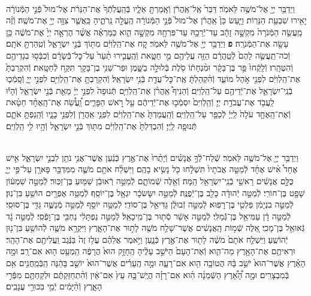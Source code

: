 \documentclass[twoside, openany, parskip=half, 11pt]{book}
\begin{document}
\begin{sometimes}
\begin{footnotesize}
\begin{multicols}{2}
\\
וַיְדַבֵּ֥ר יְיָ֖ אֶל־מֹשֶׁ֥ה לֵּאמֹֽר׃ דַּבֵּר֙ אֶֽל־אַֽהֲרֹ֔ן וְֿאָֽמַרְתָּ֖ אֵלָ֑יו בְּֿהַֽעֲלֹֽתְֿךָ֙ אֶת־הַנֵּרֹ֔ת אֶל־מוּל֙ פְּֿנֵ֣י הַמְּֿנוֹרָ֔ה יָאִ֖ירוּ שִׁבְעַ֥ת הַנֵּרֽוֹת׃ וַיַּ֤עַשׂ כֵּן֙ אַֽהֲרֹ֔ן אֶל־מוּל֙ פְּֿנֵ֣י הַמְּֿנוֹרָ֔ה הֶֽעֱלָ֖ה נֵֽרֹתֶ֑יהָ כַּֽאֲשֶׁ֛ר צִוָּ֥ה יְיָ֖ אֶת־מֹשֶֽׁה׃ וְֿזֶ֨ה מַֽעֲשֵׂ֤ה הַמְּֿנֹרָה֙ מִקְשָׁ֣ה זָהָ֔ב עַד־יְֿרֵכָ֥הּ עַד־פִּרְחָ֖הּ מִקְשָׁ֣ה הִ֑וא כַּמַּרְאֶ֗ה אֲשֶׁ֨ר הֶרְאָ֤ה יְיָ֙ אֶת־מֹשֶׁ֔ה כֵּ֥ן עָשָׂ֖ה אֶת־הַמְּֿנֹרָֽה׃ \textbf{פ}
וַיְדַבֵּ֥ר יְיָ֖ אֶל־מֹשֶׁ֥ה לֵּאמֹֽר׃ קַ֚ח אֶת־הַֽלְוִיִּ֔ם מִתּ֖וֹךְ בְּֿנֵ֣י יִשְׂרָאֵ֑ל וְֿטִֽהַרְתָּ֖ אֹתָֽם׃ וְֿכֹה־תַֽעֲשֶׂ֤ה לָהֶם֙ לְֿטַֽהֲרָ֔ם הַזֵּ֥ה עֲלֵיהֶ֖ם מֵ֣י חַטָּ֑את וְֿהֶֽעֱבִ֤ירוּ תַ֨עַר֙ עַל־כׇּל־בְּֿֿשָׂרָ֔ם וְֿכִבְּֿס֥וּ בִגְדֵיהֶ֖ם וְֿהִטֶּהָֽרוּ׃ וְֿלָֽקְֿחוּ֙ פַּ֣ר בֶּן־בָּקָ֔ר וּמִ֨נְחָת֔וֹ סֹ֖לֶת בְּֿלוּלָ֣ה בַשָּׁ֑מֶן וּפַר־שֵׁנִ֥י בֶן־בָּקָ֖ר תִּקַּ֥ח לְֿחַטָּֽאת׃ וְֿהִקְרַבְתָּ֙ אֶת־הַֽלְוִיִּ֔ם לִפְנֵ֖י אֹ֣הֶל מוֹעֵ֑ד וְֿהִ֨קְהַלְתָּ֔ אֶֽת־כׇּל־עֲדַ֖ת בְּֿנֵ֥י יִשְׂרָאֵֽל׃  וְֿהִקְרַבְתָּ֥ אֶת־הַֽלְוִיִּ֖ם לִפְנֵ֣י יְיָ֑ וְֿסָֽמְֿכ֧וּ בְֿנֵֽי־יִשְׂרָאֵ֛ל אֶת־יְֿדֵיהֶ֖ם עַל־הַֽלְוִיִּֽם׃ וְֿהֵנִיף֩ אַֽהֲרֹ֨ן אֶת־הַֽלְוִיִּ֤ם תְּֿנוּפָה֙ לִפְנֵ֣י יְיָ֔ מֵאֵ֖ת בְּֿנֵ֣י יִשְׂרָאֵ֑ל וְֿהָי֕וּ לַֽעֲבֹ֖ד אֶת־עֲבֹדַ֥ת יְיָ׃ וְֿהַֽלְוִיִּם֙ יִסְמְֿכ֣וּ אֶת־יְֿדֵיהֶ֔ם עַ֖ל רֹ֣אשׁ הַפָּרִ֑ים וַֽ֠עֲשֵׂ֠ה אֶת־הָֽאֶחָ֨ד חַטָּ֜את וְֿאֶת־הָֽאֶחָ֤ד עֹלָה֙ לַֽיְיָ֔ לְֿכַפֵּ֖ר עַל־הַֽלְוִיִּֽם׃ וְֿהַֽעֲמַדְתָּ֙ אֶת־הַֽלְוִיִּ֔ם לִפְנֵ֥י אַֽהֲרֹ֖ן וְֿלִפְנֵ֣י בָנָ֑יו וְֿהֵֽנַפְתָּ֥ אֹתָ֛ם תְּֿנוּפָ֖ה לַֽיְיָ׃ וְֿהִבְדַּלְתָּ֙ אֶת־הַֽלְוִיִּ֔ם מִתּ֖וֹךְ בְּֿנֵ֣י יִשְׂרָאֵ֑ל וְֿהָ֥יוּ לִ֖י הַֽלְוִיִּֽם׃

\\
וַיְדַבֵּ֥ר יְיָ֖ אֶל־מֹשֶׁ֥ה לֵּאמֹֽר׃ שְֿׁלַח־לְֿךָ֣ אֲנָשִׁ֗ים וְֿיָתֻ֨רוּ֙ אֶת־אֶ֣רֶץ כְּֿנַ֔עַן אֲשֶׁר־אֲנִ֥י נֹתֵ֖ן לִבְנֵ֣י יִשְׂרָאֵ֑ל אִ֣ישׁ אֶחָד֩ אִ֨ישׁ אֶחָ֜ד לְֿמַטֵּ֤ה אֲבֹתָיו֙ תִּשְׁלָ֔חוּ כֹּ֖ל נָשִׂ֥יא בָהֶֽם׃ וַיִּשְׁלַ֨ח אֹתָ֥ם מֹשֶׁ֛ה מִמִּדְבַּ֥ר פָּארָ֖ן עַל־פִּ֣י יְיָ֑ כֻּלָּ֣ם אֲנָשִׁ֔ים רָאשֵׁ֥י בְֿנֵֽי־יִשְׂרָאֵ֖ל הֵֽמָּה׃  וְֿאֵ֖לֶּה שְֿׁמוֹתָ֑ם לְֿמַטֵּ֣ה רְֿאוּבֵ֔ן שַׁמּ֖וּעַ בֶּן־זַכּֽוּר׃ לְֿמַטֵּ֣ה שִׁמְע֔וֹן שָׁפָ֖ט בֶּן־חוֹרִֽי׃ לְֿמַטֵּ֣ה יְֿהוּדָ֔ה כָּלֵ֖ב בֶּן־יְֿפֻנֶּֽה׃ לְֿמַטֵּ֣ה יִשָּׂשׂכָ֔ר יִגְאָ֖ל בֶּן־יוֹסֵֽף׃ לְֿמַטֵּ֥ה אֶפְרָ֖יִם הוֹשֵׁ֥עַ בִּן־נֽוּן׃ לְֿמַטֵּ֣ה בִנְיָמִ֔ן פַּלְטִ֖י בֶּן־רָפֽוּא׃ לְֿמַטֵּ֣ה זְֿבוּלֻ֔ן גַּדִּיאֵ֖ל בֶּן־סוֹדִֽי׃ לְֿמַטֵּ֥ה יוֹסֵ֖ף לְֿמַטֵּ֣ה מְֿנַשֶּׁ֑ה גַּדִּ֖י בֶּן־סוּסִֽי׃ לְֿמַטֵּ֣ה דָ֔ן עַמִּיאֵ֖ל בֶּן־גְּֿֿמַלִּֽי׃ לְֿמַטֵּ֣ה אָשֵׁ֔ר סְֿת֖וּר בֶּן־מִֽיכָאֵֽל׃ לְֿמַטֵּ֣ה נַפְתָּלִ֔י נַחְבִּ֖י בֶּן־וָפְֿסִֽי׃ לְֿמַטֵּ֣ה גָ֔ד גְּֿאוּאֵ֖ל בֶּן־מָכִֽי׃ אֵ֚לֶּה שְֿׁמ֣וֹת הָֽאֲנָשִׁ֔ים אֲשֶׁר־שָׁלַ֥ח מֹשֶׁ֖ה לָת֣וּר אֶת־הָאָ֑רֶץ וַיִּקְרָ֥א מֹשֶׁ֛ה לְֿהוֹשֵׁ֥עַ בִּן־נ֖וּן יְֿהוֹשֻֽׁעַ׃  וַיִּשְׁלַ֤ח אֹתָם֙ מֹשֶׁ֔ה לָת֖וּר אֶת־אֶ֣רֶץ כְּֿנָ֑עַן וַיֹּ֣אמֶר אֲלֵהֶ֗ם עֲל֥וּ זֶה֙ בַּנֶּ֔גֶב וַֽעֲלִיתֶ֖ם אֶת־הָהָֽר׃ וּרְאִיתֶ֥ם אֶת־הָאָ֖רֶץ מַה־הִ֑וא וְֿאֶת־הָעָם֙ הַיֹּשֵׁ֣ב עָלֶ֔יהָ הֶֽחָזָ֥ק הוּא֙ הֲרָפֶ֔ה הַֽמְעַ֥ט ה֖וּא אִם־רָֽב׃ וּמָ֣ה הָאָ֗רֶץ אֲשֶׁר־הוּא֙ יֹשֵׁ֣ב בָּ֔הּ הֲטוֹבָ֥ה הִ֖וא אִם־רָעָ֑ה וּמָ֣ה הֶֽעָרִ֗ים אֲשֶׁר־הוּא֙ יוֹשֵׁ֣ב בָּהֵ֔נָּה הַֽבְּֿמַֽחֲנִ֖ים אִ֥ם בְּֿמִבְצָרִֽים׃ וּמָ֣ה הָ֠אָ֠רֶץ הַשְּֿׁמֵנָ֨ה הִ֜וא אִם־רָזָ֗ה הֲיֶֽשׁ־בָּ֥הּ עֵץ֙ אִם־אַ֔יִן וְֿהִ֨תְחַזַּקְתֶּ֔ם וּלְקַחְתֶּ֖ם מִפְּֿרִ֣י הָאָ֑רֶץ וְֿהַ֨יָּמִ֔ים יְֿמֵ֖י בִּכּוּרֵ֥י עֲנָבִֽים׃


\end{multicols}
\end{footnotesize}
\end{sometimes}
\end{document}
